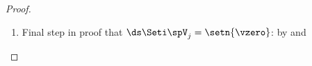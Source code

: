 \begin{proof}
\begin{enumerate}
\begin{align*}
        &&   \text{by property of $\opDil$} && \text{\xref{prop:opDi}}
      \\&=   \lim_{j\to-\infty}B\sum_{n\in\Z}\norm{\ff}^2\norm{\opDil^j\brb{\brs{\mcom{\opTrn^n\opTrn^{-n}}{$\opI$}\setind_\intcc{-R}{R}(2^{-j}x)}\brs{\opTrn^n\fphi(x)}}}^2
        &&   \text{by property of $\opTrn$} && \text{\xref{prop:opTi}}
      \\&=   \lim_{j\to-\infty}B\sum_{n\in\Z}\norm{\ff}^2\norm{\opDil^j\brb{\brs{\opTrn^n\setind_\intcc{-R}{R}(2^{-j}x+n)}\brs{\opTrn^n\fphi(x)}}}^2
        &&   \text{by property of $\opTrn$} && \text{\xref{prop:opTi}}
      \\&=   \lim_{j\to-\infty}B\sum_{n\in\Z}\norm{\ff}^2\norm{\opDil^j\opTrn^n\brb{\setind_\intcc{-R}{R}(2^{-j}x+n)\fphi(x)}}^2
        &&   \text{by property of $\opDil$} && \text{\xref{prop:opDi}}
      \\&=   \lim_{j\to-\infty}B\sum_{n\in\Z}\norm{\ff}^2\norm{\setind_\intcc{-R}{R}(2^{-j}x+n)\fphi(x)}^2
        &&   \text{by \prope{unitary} prop.} && \text{\xref{thm:TD_unitary}}
      \\&=   B\norm{\ff}^2\sum_{n\in\Z}\lim_{j\to-\infty}\norm{\setind_\intcc{-2^jR+n}{2^jR+n}(u)\fphi(2^{-j}(u-n))}^2
        &&   \text{$u\eqd 2^jx+n\implies$} && x=2^{-j}(u-n)
      \\&=   B\norm{\ff}^2\sum_{n\in\Z}\lim_{j\to-\infty}\int_{-2^jR+n}^{2^jR+n}\abs{\fphi(2^{-j}(u-n))}^2\du
      \\&=   B\norm{\ff}^2\sum_{n\in\Z}\int_{n}^{n}\abs{\fphi(0)}^2\du
      \\&=   0
    \end{align*}

  \item Final step in proof that $\ds\Seti\spV_j=\setn{\vzero}$: by  and 
\end{enumerate}
\end{proof}



